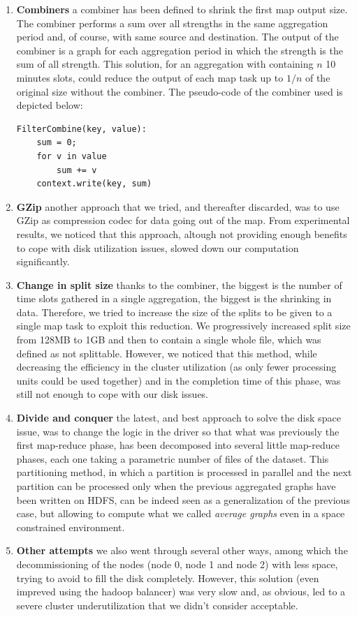 \begin{enumerate}
\item \textbf{Combiners} a combiner has been defined to shrink the first map output size. The combiner performs a sum over all strengths in the same aggregation period and, of course, with same source and destination. 
The output of the combiner is a graph for each aggregation period in which the strength is the sum of all strength.
This solution, for an aggregation with containing $n$ 10 minutes slots, could reduce the output of each map task up to $1/n$ of the original size without the combiner. 
The pseudo-code of the combiner used is depicted below:
\begin{verbatim}
FilterCombine(key, value):
	sum = 0;
	for v in value
		sum += v
	context.write(key, sum)
\end{verbatim}
\item \textbf{GZip} another approach that we tried, and thereafter discarded, was to use GZip as compression codec for data going out of the map. From experimental results, we noticed that this approach, altough not providing enough benefits
to cope with disk utilization issues, slowed down our computation significantly.
\item \textbf{Change in split size} thanks to the combiner, the biggest is the number of time slots gathered in a single aggregation, the biggest is the shrinking in data. 
Therefore, we tried to increase the size of the splits to be given to a single map task to exploit this reduction. We progressively increased split size from 128MB to 1GB and then to contain a single whole file, which was defined as not splittable.
However, we noticed that this method, while decreasing the efficiency in the cluster utilization (as only fewer processing units could be used together) and in the completion time of this phase, was still not enough to cope with our disk issues.
\item \textbf{Divide and conquer} the latest, and best approach to solve the disk space issue, was to change the logic in the driver so that what was previously the first map-reduce phase, has been decomposed into several little map-reduce phases, each one taking a parametric number of files of the dataset.
This partitioning method, in which a partition is processed in parallel and the next partition can be processed only when the previous aggregated graphs have been written on HDFS, can be indeed seen as a generalization of the previous case, but allowing to compute what we called \emph{average graphs} even in a space constrained environment. 
\item \textbf{Other attempts} we also went through several other ways, among which the decommissioning of the nodes (node 0, node 1 and node 2) with less space, trying to avoid to fill the disk completely.
However, this solution (even impreved using the hadoop balancer) was very slow and, as obvious, led to a severe cluster underutilization that we didn't consider acceptable.
\end{enumerate}
